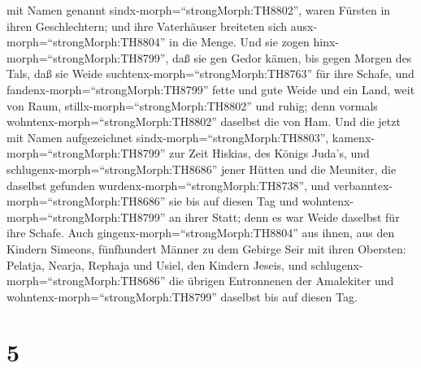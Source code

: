 mit Namen genannt sindx-morph=``strongMorph:TH8802'', waren Fürsten in
ihren Geschlechtern; und ihre Vaterhäuser breiteten sich
ausx-morph=``strongMorph:TH8804'' in die Menge.  Und sie
zogen hinx-morph=``strongMorph:TH8799'', daß sie gen Gedor kämen, bis
gegen Morgen des Tals, daß sie Weide
suchtenx-morph=``strongMorph:TH8763'' für ihre Schafe,  und
fandenx-morph=``strongMorph:TH8799'' fette und gute Weide und ein Land,
weit von Raum, stillx-morph=``strongMorph:TH8802'' und ruhig; denn
vormals wohntenx-morph=``strongMorph:TH8802'' daselbst die von Ham.
 Und die jetzt mit Namen aufgezeichnet
sindx-morph=``strongMorph:TH8803'', kamenx-morph=``strongMorph:TH8799''
zur Zeit Hiskias, des Königs Juda's, und
schlugenx-morph=``strongMorph:TH8686'' jener Hütten und die Meuniter,
die daselbst gefunden wurdenx-morph=``strongMorph:TH8738'', und
verbanntex-morph=``strongMorph:TH8686'' sie bis auf diesen Tag und
wohntenx-morph=``strongMorph:TH8799'' an ihrer Statt; denn es war Weide
daselbst für ihre Schafe.  Auch
gingenx-morph=``strongMorph:TH8804'' aus ihnen, aus den Kindern Simeons,
fünfhundert Männer zu dem Gebirge Seir mit ihren Obersten: Pelatja,
Nearja, Rephaja und Usiel, den Kindern Jeseis,  und
schlugenx-morph=``strongMorph:TH8686'' die übrigen Entronnenen der
Amalekiter und wohntenx-morph=``strongMorph:TH8799'' daselbst bis auf
diesen Tag.

\hypertarget{section-4}{%
\section{5}\label{section-4}}

